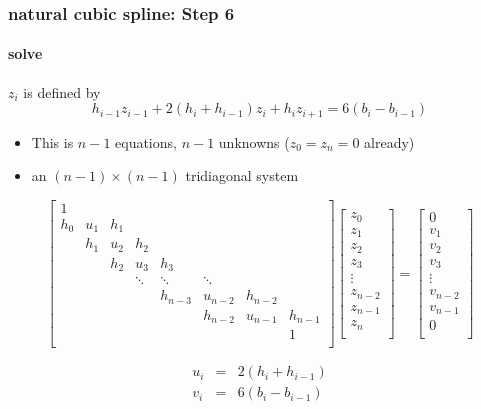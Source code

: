 \documentclass[10pt]{beamer}
\begin{document}
\begin{frame}
\frametitle{natural cubic spline: Step 6}
\framesubtitle{solve}
$z_i$ is defined by
\begin{equation*}
  h_{i-1}z_{i-1} + 2(h_i+h_{i-1})z_i + h_{i}z_{i+1} = 6(b_i-b_{i-1})
\end{equation*}
\begin{itemize}
  \item This is $n-1$ equations, $n-1$ unknowns ($z_0=z_n=0$ already)
  \item an $(n-1)\times (n-1)$ tridiagonal system
\end{itemize}
\[
\begin{bmatrix}
 1 &  & & & & & & \\ 
 h_0 & u_1  & h_1 & & & & & \\ 
 & h_1            &  u_2 & h_2 & & & & \\ 
 &                & h_2             & u_3 & h_3  & & & \\ 
 &                &                 & \ddots  & \ddots & \ddots & & \\  
 &  &   &   & h_{n-3} & u_{n-2} & h_{n-2}  & \\ 
 &  &   &   &         & h_{n-2} &  u_{n-1}& h_{n-1}\\
 &  &   &   &         &         &        & 1\\
\end{bmatrix}
\begin{bmatrix}
z_0\\z_1\\  z_2\\  z_3\\  \vdots\\  z_{n-2}\\  z_{n-1}\\z_n\\
\end{bmatrix}
 = 
\begin{bmatrix}
0\\v_1\\  v_2\\  v_3\\  \vdots\\  v_{n-2}\\  v_{n-1}\\0\\
\end{bmatrix}
\] 
 
\begin{eqnarray*}
u_i & = & 2 (h_i + h_{i-1} ) \\
v_i & = & 6(b_i - b_{i-1})
\end{eqnarray*} 
\end{frame}
\end{document}
